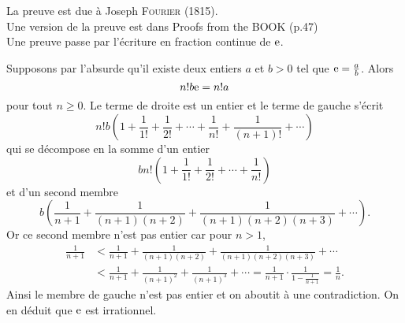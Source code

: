 La preuve est due à Joseph \textsc{Fourier} (1815). \\
Une version de la preuve est dans Proofs from the BOOK (p.47) \\
Une preuve passe par l'écriture en fraction continue de $\mathrm{e}$.

\begin{preuve}
    Supposons par l'absurde qu'il existe deux entiers $a$ et $b > 0$ tel que $\mathrm{e} = \frac{a}{b}$. Alors
    $$n! b \mathrm{e} = n! a$$
    pour tout $n \geqslant 0$. Le terme de droite est un entier et le terme de gauche s'écrit
    $$n! b \left(1 + \frac{1}{1!} + \frac{1}{2!} + \cdots + \frac{1}{n!} + \frac{1}{(n+1)!} + \cdots \right)$$
    qui se décompose en la somme d'un entier
    $$b n! \left(1 + \frac{1}{1!} + \frac{1}{2!} + \cdots + \frac{1}{n!} \right)$$
    et d'un second membre
    $$b \left( \frac{1}{n+1} + \frac{1}{(n+1)(n+2)} + \frac{1}{(n+1)(n+2)(n+3)}+ \cdots \right).$$
    Or ce second membre n'est pas entier car pour $n > 1$,
    \begin{align*}
        \frac{1}{n+1} &< \frac{1}{n+1} + \frac{1}{(n+1)(n+2)} + \frac{1}{(n+1)(n+2)(n+3)} + \cdots \\
        & < \frac{1}{n+1} + \frac{1}{(n+1)^2} + \frac{1}{(n+1)^3} + \cdots = \frac{1}{n+1} \cdot \frac{1}{1-\frac{1}{n+1}} = \frac{1}{n}.
    \end{align*}
    Ainsi le membre de gauche n'est pas entier et on aboutit à une contradiction. On en déduit que $\mathrm{e}$ est irrationnel.
\end{preuve}

